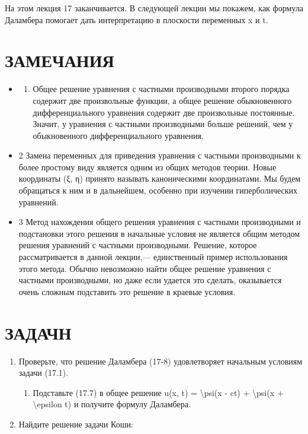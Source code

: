 \documentclass[
]{article}
\providecommand{\tightlist}{%
  \setlength{\itemsep}{0pt}\setlength{\parskip}{0pt}}
\begin{document}
На этом лекция 17 заканчивается. В следующей лекции мы покажем, как
формула Даламбера помогает дать интерпретацию в плоскости переменных x и
t.

\section{ЗАМЕЧАНИЯ}\label{ux437ux430ux43cux435ux447ux430ux43dux438ux44f-2}

\begin{itemize}
\item
  \begin{enumerate}
  \def\labelenumi{\arabic{enumi}.}
  \tightlist
  \item
    Общее решение уравнения с частными производными второго порядка
    содержит две произвольные функции, а общее решение обыкновенного
    дифференциального уравнения содержит две произвольные постоянные.
    Значит, у уравнения с частными производными больше решений, чем у
    обыкновенного дифференциального уравнения.
  \end{enumerate}
\item
  2 Замена переменных для приведения уравнения с частными производными к
  более простому виду является одним из общих методов теории. Новые
  координаты (ξ, η) принято называть каноническими координатами. Мы
  будем обращаться к ним и в дальнейшем, особенно при изучении
  гиперболических уравнений.
\item
  3 Метод нахождения общего решения уравнения с частными производными и
  подстановки этого решения в начальные условия не является общим
  методом решения уравнений с частными производными. Решение, которое
  рассматривается в данной лекции,--- единственный пример использования
  этого метода. Обычно невозможно найти общее решение уравнения с
  частными производными, но даже если удается это сделать, оказывается
  очень сложным подставить это решение в краевые условия.
\end{itemize}

\section{ЗАДАЧН}\label{ux437ux430ux434ux430ux447ux43d}

\begin{enumerate}
\def\labelenumi{\arabic{enumi}.}
\item
  Проверьте, что решение Даламбера (17-8) удовлетворяет начальным
  условиям задачи (17.1).

  \begin{enumerate}
  \def\labelenumii{\arabic{enumii}.}
  \setcounter{enumii}{1}
  \tightlist
  \item
    Подставьте (17.7) в общее решение u(x, t) = \textbackslash psi(x -
    ct) + \textbackslash psi(x + \textbackslash epsilon t) и получите
    формулу Даламбера.
  \end{enumerate}
\item
  Найдите решение задачи Коши:
\end{enumerate}
\end{document}
